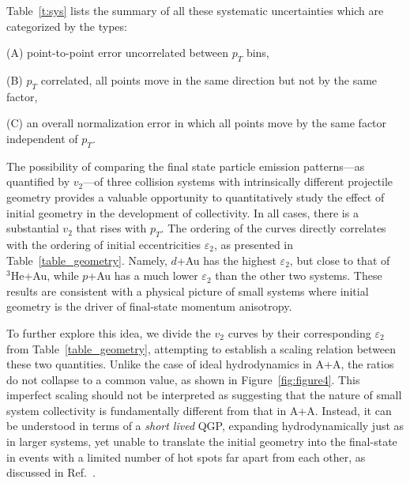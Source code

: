 \documentclass[%
reprint,
showpacs,preprintnumbers,
 amsmath,amssymb,
 aps,
]{revtex4-1}
\newcommand{\pt}{\mbox{$p_T$}\xspace}
\newcommand{\dau}{\mbox{$d$+Au}\xspace}
\newcommand{\pau}{\mbox{$p$+Au}\xspace}
\newcommand{\hau}{\mbox{$^3\text{He}$+Au}\xspace}
\begin{document}
Table~\ref{t:sys} lists the summary of all these systematic
uncertainties which are categorized by the types:

(A) point-to-point error uncorrelated between $p_T$ bins,

(B) $p_{T}$ correlated, all points move in the same direction but
not by the same factor,

(C) an overall normalization error in which all points move by the
same factor independent of $p_T$.

The possibility of comparing the final state particle emission patterns---as quantified by $v_2$---of three collision systems with intrinsically different projectile geometry provides a valuable opportunity to quantitatively study the effect of initial geometry in the development of collectivity.  In all cases, there is a substantial $v_2$ that rises with \pt. The ordering of the curves directly correlates with the ordering of initial eccentricities $\varepsilon_2$, as presented in Table~\ref{table_geometry}. Namely, \dau has the highest $\varepsilon_2$, but close to that of \hau, while \pau has a much lower $\varepsilon_2$ than the other two systems. These results are consistent with a physical picture of small systems where initial geometry is the driver of final-state momentum anisotropy.

To further explore this idea, we divide the $v_2$ curves by their corresponding $\varepsilon_2$ from Table~\ref{table_geometry}, attempting to establish a scaling relation between these two quantities. Unlike the case of ideal hydrodynamics in A+A, the ratios do not collapse to a common value, as shown in Figure~\ref{fig:figure4}. This imperfect scaling should not be interpreted as suggesting that the nature of small system collectivity is fundamentally different from that in A+A. Instead, it can be understood in terms of a \emph{short lived} QGP, expanding hydrodynamically just as in larger systems, yet unable to translate the initial geometry into the final-state in events with a limited number of hot spots far apart from each other, as discussed in Ref.~\cite{nagle_exploiting_2013}.
\end{document}
